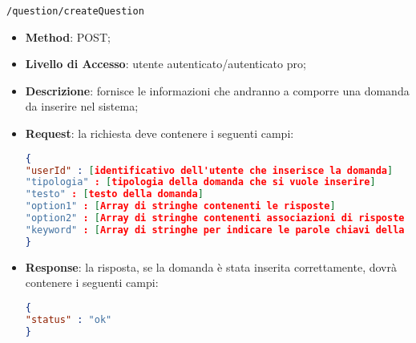 	\item \texttt{/question/createQuestion}
		\begin{itemize}
			\item \textbf{Method}: POST;
			\item \textbf{Livello di Accesso}: utente autenticato/autenticato pro;
			\item \textbf{Descrizione}: fornisce le informazioni che andranno a comporre una domanda da inserire nel sistema;
			\item \textbf{Request}: la richiesta deve contenere i seguenti campi:
\begin{lstlisting}[language=json,firstnumber=1]
{
"userId" : [identificativo dell'utente che inserisce la domanda]
"tipologia" : [tipologia della domanda che si vuole inserire]
"testo" : [testo della domanda]
"option1" : [Array di stringhe contenenti le risposte]
"option2" : [Array di stringhe contenenti associazioni di risposte o la risposta esatta]
"keyword" : [Array di stringhe per indicare le parole chiavi della domanda]
}
\end{lstlisting}
			\item \textbf{Response}: la risposta, se la domanda è stata inserita correttamente, dovrà contenere i seguenti campi:
\begin{lstlisting}[language=json,firstnumber=1]
{
"status" : "ok"
}
\end{lstlisting}
		\end{itemize}